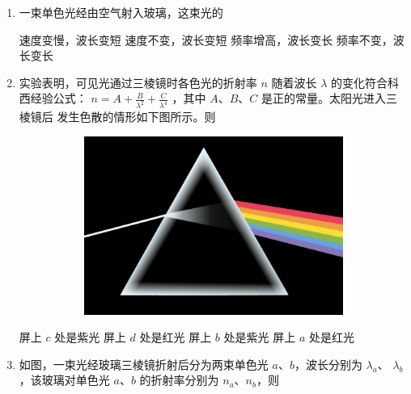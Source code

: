 \begin{enumerate}
\item 
{}
一束单色光经由空气射入玻璃，这束光的  


\fourchoices
{速度变慢，波长变短}
{速度不变，波长变短}
{频率增高，波长变长}
{频率不变，波长变长}



\item 
{}
实验表明，可见光通过三棱镜时各色光的折射率 $ n $ 随着波长 $ \lambda $ 的变化符合科西经验公式：
$n=A+\frac{B}{\lambda^{2}}+\frac{C}{\lambda^{4}}$
，其中 $ A $、$ B $、$ C $
是正的常量。太阳光进入三棱镜后
发生色散的情形如下图所示。则  
\begin{figure}[h!]
	\centering
\begin{subfigure}{0.4\linewidth}
	\centering
\includegraphics[width=0.7\linewidth]{picture/screenshot082}
	\caption{}\label{}
\end{subfigure}
\begin{subfigure}{0.4\linewidth}
	\centering
	 
	\caption{}\label{}
\end{subfigure}
\end{figure}

\fourchoices
{屏上 $ c $ 处是紫光}
{屏上 $ d $ 处是红光}
{屏上 $ b $ 处是紫光}
{屏上 $ a $ 处是红光}



\item
{}
如图，一束光经玻璃三棱镜折射后分为两束单色光 $ a $、$ b $，波长分别为 $ \lambda_{a} $、
$ \lambda_{b} $，该玻璃对单色光 $ a $、$ b $ 的折射率分别为 $ n_{a} $、$ n_{b} $，则  
\begin{figure}[h!]
	\centering
	
\end{figure}



\end{enumerate}
